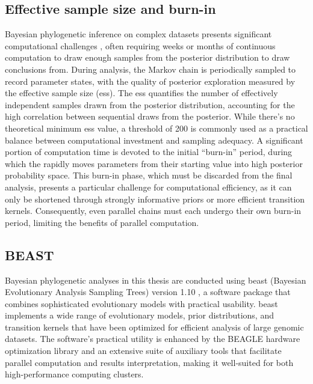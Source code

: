 \subsection{Effective sample size and burn-in}

Bayesian phylogenetic inference on complex datasets presents significant computational challenges \citep{suchard2009many-core}, often requiring weeks or months of continuous computation to draw enough samples from the posterior distribution to draw conclusions from.
During analysis, the Markov chain is periodically sampled to record parameter states, with the quality of posterior exploration measured by the effective sample size (\gls{ess}).
The \gls{ess} \citep{lanfear2016estimating} quantifies the number of effectively independent samples drawn from the posterior distribution, accounting for the high correlation between sequential draws from the posterior.
While there's no theoretical minimum \gls{ess} value, a threshold of 200 is commonly used as a practical balance between computational investment and sampling adequacy.
A significant portion of computation time is devoted to the initial ``burn-in'' period, during which the rapidly moves parameters from their starting value into high posterior probability space.
This burn-in phase, which must be discarded from the final analysis, presents a particular challenge for computational efficiency, as it can only be shortened through strongly informative priors or more efficient transition kernels.
Consequently, even parallel chains must each undergo their own burn-in period, limiting the benefits of parallel computation.

\subsection{BEAST}
Bayesian phylogenetic analyses in this thesis are conducted using \gls{beast} (Bayesian Evolutionary Analysis Sampling Trees) version 1.10 \citep{suchard2018bayesian}, a software package that combines sophisticated evolutionary models with practical usability.
\gls{beast} implements a wide range of evolutionary models, prior distributions, and transition kernels that have been optimized for efficient analysis of large genomic datasets. 
The software's practical utility is enhanced by the BEAGLE \citep{ayres2019beagle} hardware optimization library and an extensive suite of auxiliary tools that facilitate parallel computation and results interpretation, making it well-suited for both high-performance computing clusters.

\cleardoublepage

